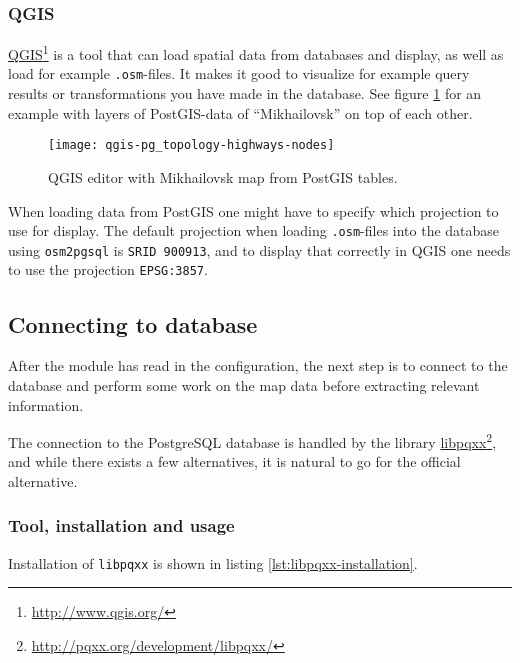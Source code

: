 \documentclass[../main.tex]{subfiles}
\begin{document}
\subsubsection{QGIS}
\href{http://www.qgis.org/}{QGIS}\footnote{\url{http://www.qgis.org/}} is a tool that can load spatial data from databases and display, as well as load for example \texttt{.osm}-files. It makes it good to visualize for example query results or transformations you have made in the database. See figure \ref{fig:qgis-mikhailovsk} for an example with layers of PostGIS-data of ``Mikhailovsk'' on top of each other.

\begin{figure}[h]
    \centering
    \texttt{[image: qgis-pg\_topology-highways-nodes]}
    \caption{QGIS editor with Mikhailovsk map from PostGIS tables.}
    \label{fig:qgis-mikhailovsk}
\end{figure}

When loading data from PostGIS one might have to specify which projection to use for display. The default projection when loading \texttt{.osm}-files into the database using \texttt{osm2pgsql} is \texttt{SRID 900913}, and to display that correctly in QGIS one needs to use the projection \texttt{EPSG:3857}.

\subsection{Connecting to database}
After the module has read in the configuration, the next step is to connect to the database and perform some work on the map data before extracting relevant information.

The connection to the PostgreSQL database is handled by the library \href{http://pqxx.org/development/libpqxx/}{libpqxx}\footnote{\url{http://pqxx.org/development/libpqxx/}}, and while there exists a few alternatives, it is natural to go for the official alternative.

\subsubsection{Tool, installation and usage}
Installation of \texttt{libpqxx} is shown in listing \ref{lst:libpqxx-installation}.
\end{document}
